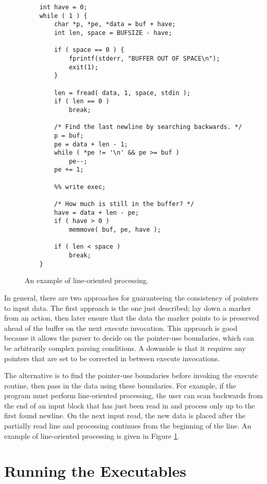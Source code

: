 \documentclass[letterpaper,11pt,oneside]{book}
\begin{document}
\begin{figure}
\small
\begin{verbatim}
    int have = 0;
    while ( 1 ) {
        char *p, *pe, *data = buf + have;
        int len, space = BUFSIZE - have;

        if ( space == 0 ) { 
            fprintf(stderr, "BUFFER OUT OF SPACE\n");
            exit(1);
        }

        len = fread( data, 1, space, stdin );
        if ( len == 0 )
            break;

        /* Find the last newline by searching backwards. */
        p = buf;
        pe = data + len - 1;
        while ( *pe != '\n' && pe >= buf )
            pe--;
        pe += 1;

        %% write exec;

        /* How much is still in the buffer? */
        have = data + len - pe;
        if ( have > 0 )
            memmove( buf, pe, have );

        if ( len < space )
            break;
    }
\end{verbatim}
\caption{An example of line-oriented processing.}
\label{line-oriented}
\end{figure}

In general, there are two approaches for guaranteeing the consistency of
pointers to input data. The first approach is the one just described;
lay down a marker from an action,
then later ensure that the data the marker points to is preserved ahead of
the buffer on the next execute invocation. This approach is good because it
allows the parser to decide on the pointer-use boundaries, which can be
arbitrarily complex parsing conditions. A downside is that it requires any
pointers that are set to be corrected in between execute invocations.

The alternative is to find the pointer-use boundaries before invoking the execute
routine, then pass in the data using these boundaries. For example, if the
program must perform line-oriented processing, the user can scan backwards from
the end of an input block that has just been read in and process only up to the
first found newline. On the next input read, the new data is placed after the
partially read line and processing continues from the beginning of the line.
An example of line-oriented processing is given in Figure \ref{line-oriented}.


\section{Running the Executables}
\end{document}
